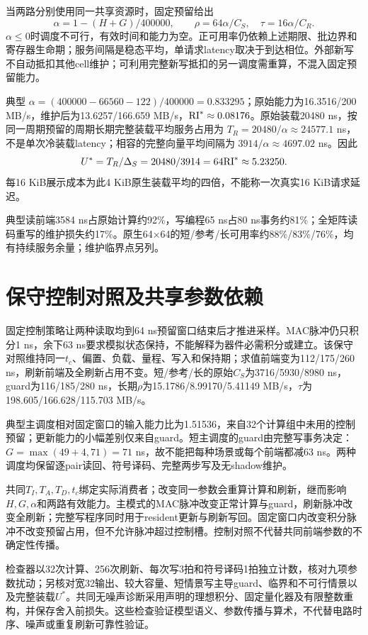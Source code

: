当两路分别使用同一共享资源时，固定预留给出
\[
\alpha=1-(H+G)/400000,\qquad
\rho=64\alpha/C_S,\quad\tau=16\alpha/C_R.
\]
$\alpha\le0$时调度不可行，有效时间和能力为空。正可用率仍依赖上述期限、批边界和寄存器生命期；服务间隔是稳态平均，单请求latency取决于到达相位。外部新写不自动抵扣其他cell维护；可利用完整新写抵扣的另一调度需重算，不混入固定预留能力。



典型 $\alpha=(400000-66560-122)/400000=0.833295$；原始能力为16.3516/200 MB/s，维护后为13.6257/166.659 MB/s，$\mathrm{RI}^*\approx0.08176$。原始装载20480 ns，按同一周期预留的周期长期完整装载平均服务占用为 $T_R=20480/\alpha\approx24577.1$ ns，不是单次冷装载latency；相容的完整向量平均间隔为 $3914/\alpha\approx4697.02$ ns。因此
\[
U^*=T_R/\Delta_S=20480/3914=64\mathrm{RI}^*\approx5.23250.
\]
每16 KiB展示成本为此4 KiB原生装载平均的四倍，不能称一次真实16 KiB请求延迟。

典型读前端3584 ns占原始计算约92\%，写编程65 ns占80 ns事务约81\%；全矩阵读码重写的维护损失约17\%。原生64×64的短/参考/长可用率约88\%/83\%/76\%，均有持续服务余量；维护临界点另列。

\section{保守控制对照及共享参数依赖}

固定控制策略让两种读取均到64 ns预留窗口结束后才推进采样。MAC脉冲仍只积分1 ns，余下63 ns要求模拟状态保持，不能解释为器件必需积分或建立。该保守对照维持同一$t_c$、偏置、负载、量程、写入和保持期；求值前端变为112/175/260 ns，刷新前端及全刷新占用不变。短/参考/长的原始$C_S$为3716/5930/8980 ns，guard为116/185/280 ns，长期$\rho$为15.1786/8.99170/5.41149 MB/s，$\tau$为198.605/166.628/115.703 MB/s。

典型主调度相对固定窗口的输入能力比为1.51536，来自32个计算组中未用的控制预留；更新能力的小幅差别仅来自guard。短主调度的guard由完整写事务决定：$G=\max(49+4,71)=71$ ns，故不能把每种场景或每个前端都减63 ns。两种调度均保留逐pair读回、符号译码、完整两步写及无shadow维护。

共同$T_I,T_A,T_D,t_c$绑定实际消费者；改变同一参数会重算计算和刷新，继而影响$H,G,\alpha$和两路有效能力。主模式的MAC脉冲改变正常计算与guard，刷新脉冲改变全刷新；完整写程序同时用于resident更新与刷新写回。固定窗口内改变积分脉冲不改变预留占用，但不允许脉冲超过控制槽。控制对照不代替共同前端参数的不确定性传播。

检查器以32次计算、256次刷新、每次写3拍和符号译码1拍独立计数，核对九项参数扰动；另核对宽32输出、较大容量、短情景写主导guard、临界和不可行情景以及完整装载$U^*$。共同无噪声诊断采用声明的理想积分、固定量化器及有限整数重构，并保存舍入前损失。这些检查验证模型语义、参数传播与算术，不代替电路时序、噪声或重复刷新可靠性验证。

